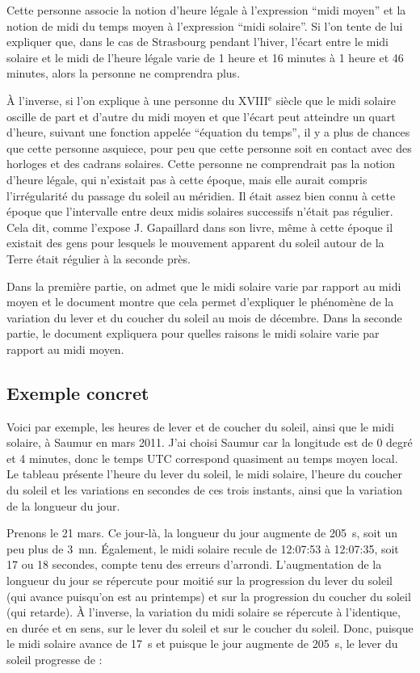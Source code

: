 \documentclass[a4paper]{article}
\newenvironment{texte}{\rmfamily}{}
\newcommand{\ee}[0]{$^\mathrm{e}$}
\begin{document}
\begin{texte}
Cette personne associe la notion d'heure légale à l'expression ``midi moyen''
et la notion de midi du temps moyen à l'expression ``midi solaire''.
Si l'on tente de lui expliquer que, dans le cas de Strasbourg pendant l'hiver, l'écart
entre le midi solaire et le midi de l'heure légale varie
de 1 heure et 16 minutes à 1 heure et 46 minutes, alors la personne
ne comprendra plus.

À l'inverse, si l'on explique à une personne du XVIII\ee{} siècle que
le midi solaire oscille de part et d'autre du midi moyen et que
l'écart peut atteindre un quart d'heure, suivant une fonction appelée
``équation du temps'', il y a plus de chances que cette personne
asquiece, pour peu que cette personne soit en contact avec des
horloges et des cadrans solaires. Cette personne ne comprendrait pas
la notion d'heure légale, qui n'existait pas à cette époque, mais elle
aurait compris l'irrégularité du passage du soleil au méridien. Il
était assez bien connu à cette époque que l'intervalle entre deux
midis solaires successifs n'était pas régulier. Cela dit, comme
l'expose J. Gapaillard dans son livre, même à cette époque il existait
des gens pour lesquels le mouvement apparent du soleil autour de la
Terre était régulier à la seconde près.

Dans la première partie, on admet que le midi solaire varie par rapport
au midi moyen et le document montre que cela permet d'expliquer le phénomène
de la variation du lever et du coucher du soleil au mois de décembre.
Dans la seconde partie, le document expliquera pour quelles
raisons le midi solaire varie par rapport au midi moyen.

\subsection{Exemple concret}

Voici par exemple, les heures de lever et de coucher du soleil, ainsi
que le midi solaire, à Saumur en mars 2011. J'ai choisi Saumur car la
longitude est de 0 degré et 4 minutes, donc le temps UTC correspond
quasiment au temps moyen local. Le tableau présente l'heure du lever
du soleil, le midi solaire, l'heure du coucher du soleil et les variations
en secondes de ces trois instants, ainsi que la variation de la longueur
du jour.

\vspace{2mm}
\vspace{2mm}

Prenons le 21 mars. Ce jour-là, la longueur du jour augmente de 205~s,
soit un peu plus de 3~mn. Également, le midi solaire recule de
12:07:53 à 12:07:35, soit 17 ou 18 secondes, compte tenu des erreurs
d'arrondi. L'augmentation de la longueur du jour se répercute pour
moitié sur la progression du lever du soleil (qui avance puisqu'on est
au printemps) et sur la progression du coucher du soleil (qui retarde).
À l'inverse, la variation du midi solaire se répercute à l'identique,
en durée et en sens, sur le lever du soleil et sur le coucher du
soleil. Donc, puisque le midi solaire avance de 17~s et puisque
le jour augmente de 205~s, le lever du soleil progresse de :


\end{texte}
\end{document}
